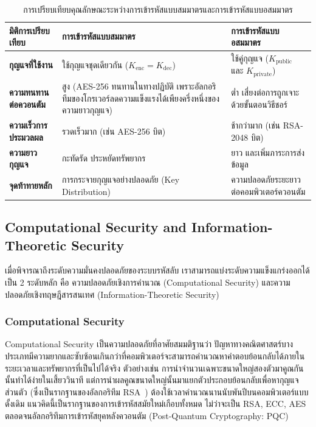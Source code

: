 \begin{table}[htbp]
\centering
\renewcommand{\arraystretch}{1.35}
\setlength{\extrarowheight}{2.5pt}
\begin{tabularx}{\textwidth}{>{\raggedright\arraybackslash}p{3.5cm} >{\raggedright\arraybackslash}X >{\raggedright\arraybackslash}X}
\hline
\textbf{มิติการเปรียบเทียบ} & \textbf{การเข้ารหัสแบบสมมาตร} & \textbf{การเข้ารหัสแบบอสมมาตร} \\ \hline
\rowcolor{white}
\textbf{กุญแจที่ใช้งาน} & ใช้กุญแจชุดเดียวกัน ($K_{\text{enc}} = K_{\text{dec}}$) & ใช้คู่กุญแจ ($K_{\text{public}}$ และ $K_{\text{private}}$) \\
\rowcolor[HTML]{E4E7EB}
\textbf{ความทนทานต่อควอนตัม} & สูง (AES-256 ทนทานในทางปฏิบัติ เพราะอัลกอริทึมของโกรเวอร์ลดความแข็งแรงได้เพียงครึ่งหนึ่งของความยาวกุญแจ) & ต่ำ เสี่ยงต่อการถูกเจาะด้วยขั้นตอนวิธีชอร์ \\
\rowcolor{white}
\textbf{ความเร็วการประมวลผล} & รวดเร็วมาก (เช่น AES-256 บิต) & ช้ากว่ามาก (เช่น RSA-2048 บิต) \\
\rowcolor[HTML]{E4E7EB}
\textbf{ความยาวกุญแจ} & กะทัดรัด ประหยัดทรัพยากร & ยาว และเพิ่มภาระการส่งข้อมูล \\
\rowcolor{white}
\textbf{จุดท้าทายหลัก} & การกระจายกุญแจอย่างปลอดภัย (Key Distribution) & ความปลอดภัยระยะยาวต่อคอมพิวเตอร์ควอนตัม \\ \hline
\end{tabularx}
\caption{การเปรียบเทียบคุณลักษณะระหว่างการเข้ารหัสแบบสมมาตรและการเข้ารหัสแบบอสมมาตร}
\label{tab:symmetric_vs_asymmetric}
\end{table}

\subsection{Computational Security and Information-Theoretic Security}
เมื่อพิจารณาถึงระดับความมั่นคงปลอดภัยของระบบรหัสลับ เราสามารถแบ่งระดับความแข็งแกร่งออกได้เป็น 2 ระดับหลัก คือ ความปลอดภัยเชิงการคำนวณ (Computational Security) และความปลอดภัยเชิงทฤษฎีสารสนเทศ (Information-Theoretic Security)

\subsubsection{Computational Security}
Computational Security เป็นความปลอดภัยที่อาศัยสมมติฐานว่า ปัญหาทางคณิตศาสตร์บางประเภทมีความยากและซับซ้อนเกินกว่าที่คอมพิวเตอร์จะสามารถคำนวณหาคำตอบย้อนกลับได้ภายในระยะเวลาและทรัพยากรที่เป็นไปได้จริง ตัวอย่างเช่น การนำจำนวนเฉพาะขนาดใหญ่สองตัวมาคูณกันนั้นทำได้ง่ายในเสี้ยววินาที แต่การนำผลคูณขนาดใหญ่นั้นมาแยกตัวประกอบย้อนกลับเพื่อหากุญแจส่วนตัว (ซึ่งเป็นรากฐานของอัลกอริทึม RSA~\cite{rivest_rsa}) ต้องใช้เวลาคำนวณนานนับพันปีบนคอมพิวเตอร์แบบดั้งเดิม แนวคิดนี้เป็นรากฐานของการเข้ารหัสสมัยใหม่เกือบทั้งหมด ไม่ว่าจะเป็น RSA, ECC, AES ตลอดจนอัลกอริทึมการเข้ารหัสยุคหลังควอนตัม (Post-Quantum Cryptography: PQC)~\cite{nist_pqc}

